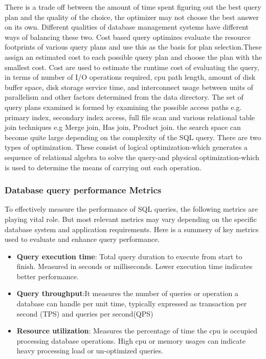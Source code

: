 There is a trade off between the amount of time spent figuring out the best query plan and the quality of the choice, the optimizer may not choose the best answer on its own. Different qualities of database management systems have different ways of balancing these two. Cost based query optimizes  evaluate the resource footprints of various query plans and use this as the basis for plan selection.These assign an estimated cost to each possible query plan and choose the plan with the smallest cost. Cost are used to estimate the runtime cost of evaluating the query, in terms of number of I/O operations required, cpu path length, amount of disk buffer space, disk storage service time, and interconnect usage between units of parallelism and other factors determined from the data directory. The set of query plans examined is formed by examining the possible access paths e.g. primary index, secondary index access, full file scan and various relational table join techniques e.g Merge join, Has join, Product join. the search space can become  quite large depending on the complexity of the SQL query. There are two types of optimization. These consist of logical optimization-which generates a sequence of relational algebra to solve the query-and physical optimization-which is used to determine the means of carrying out each operation.\cite{dremio-2024}


\subsubsection{Database query performance Metrics}
To effectively measure the performance of SQL queries, the following metrics are playing vital role. But most relevant metrics may vary depending on the specific database system and application requirements.
Here is a summery of key metrics used to evaluate and enhance query performance.\cite{chwesewicz-2024}
\begin{itemize}
    \item\textbf{Query execution time}: Total query duration to execute from start to finish. Measured in seconds or milliseconds. Lower execution time indicates better performance.
    \item\textbf{Query throughput}:It measures the number of queries or operation a database can handle per unit time, typically expressed as transaction per second (TPS) and queries per second(QPS)
    \item\textbf{Resource utilization}: Measures the percentage of time the cpu is occupied processing database operations. High cpu or memory usages can indicate heavy processing load or un-optimized queries.
\end{itemize}

